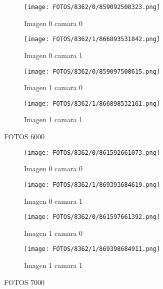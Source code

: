 \documentclass{article}
\begin{document}
\begin{figure}[H]
  \centering
  \begin{minipage}[b]{0.45\textwidth}
    \centering
    \texttt{[image: FOTOS/8362/0/859092508323.png]}
    \caption{Imagen 0 camara 0}
  \end{minipage}
  \begin{minipage}[b]{0.45\textwidth}
    \centering
    \texttt{[image: FOTOS/8362/1/866893531842.png]}
    \caption{Imagen 0 camara 1}
  \end{minipage}
  \begin{minipage}[b]{0.45\textwidth}
    \centering
    \texttt{[image: FOTOS/8362/0/859097508615.png]}
    \caption{Imagen 1 camara 0}
  \end{minipage}
  \begin{minipage}[b]{0.45\textwidth}
    \centering
    \texttt{[image: FOTOS/8362/1/866898532161.png]}
    \caption{Imagen 1 camara 1}
  \end{minipage}
\end{figure}

FOTOS 6000

\begin{figure}[H]
  \centering
  \begin{minipage}[b]{0.45\textwidth}
    \centering
    \texttt{[image: FOTOS/8362/0/861592661073.png]}
    \caption{Imagen 0 camara 0}
  \end{minipage}
  \begin{minipage}[b]{0.45\textwidth}
    \centering
    \texttt{[image: FOTOS/8362/1/869393684619.png]}
    \caption{Imagen 0 camara 1}
  \end{minipage}
  \begin{minipage}[b]{0.45\textwidth}
    \centering
    \texttt{[image: FOTOS/8362/0/861597661392.png]}
    \caption{Imagen 1 camara 0}
  \end{minipage}
  \begin{minipage}[b]{0.45\textwidth}
    \centering
    \texttt{[image: FOTOS/8362/1/869398684911.png]}
    \caption{Imagen 1 camara 1}
  \end{minipage}
\end{figure}

FOTOS 7000
\end{document}
